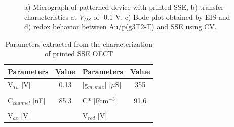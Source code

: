 \begin{figure}[ht]
    \centering
    \qquad
    \caption[Performance of solid-OECT with printed SSE]{a) Micrograph of patterned device with printed SSE, b) transfer characteristics at $V_{DS}$ of -0.1 V. c) Bode plot obtained by EIS and d) redox behavior between Au/p(g3T2-T) and SSE using CV.}
    \label{fig:printedSSE}
\end{figure}



\begin{table}[ht]
\centering
\caption{Parameters extracted from the characterization of printed SSE OECT}
\begin{tabular}{l|c||l|c}
Parameters & Value & Parameters & Value \\\hline \hline
V$_{Th}$ [V] &  0.13 & |g$_{m,max}$| [$\mu$S] & 355 \\
& & &\\[-1em]
C$_{channel}$ [nF] & 85.3 & C* [Fcm$^{-3}$] & 91.6 \\
& & &\\[-1em]
V$_{ox}$ [V] &  & V$_{red}$ [V] &  \\\hline
\hline
\end{tabular}
\label{tab:printedfom}
\end{table}

